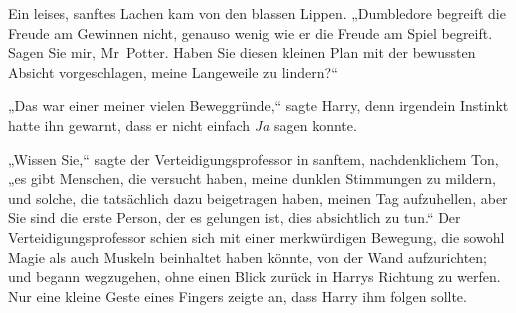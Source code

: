 Ein leises, sanftes Lachen kam von den blassen Lippen. „Dumbledore begreift die Freude am Gewinnen nicht, genauso wenig wie er die Freude am Spiel begreift. Sagen Sie mir, Mr~Potter. Haben Sie diesen kleinen Plan mit der bewussten Absicht vorgeschlagen, meine Langeweile zu lindern?“

„Das war einer meiner vielen Beweggründe,“ sagte Harry, denn irgendein Instinkt hatte ihn gewarnt, dass er nicht einfach \emph{Ja} sagen konnte.

„Wissen Sie,“ sagte der Verteidigungsprofessor in sanftem, nachdenklichem Ton, „es gibt Menschen, die versucht haben, meine dunklen Stimmungen zu mildern, und solche, die tatsächlich dazu beigetragen haben, meinen Tag aufzuhellen, aber Sie sind die erste Person, der es gelungen ist, dies absichtlich zu tun.“ Der Verteidigungsprofessor schien sich mit einer merkwürdigen Bewegung, die sowohl Magie als auch Muskeln beinhaltet haben könnte, von der Wand aufzurichten; und begann wegzugehen, ohne einen Blick zurück in Harrys Richtung zu werfen. Nur eine kleine Geste eines Fingers zeigte an, dass Harry ihm folgen sollte.

